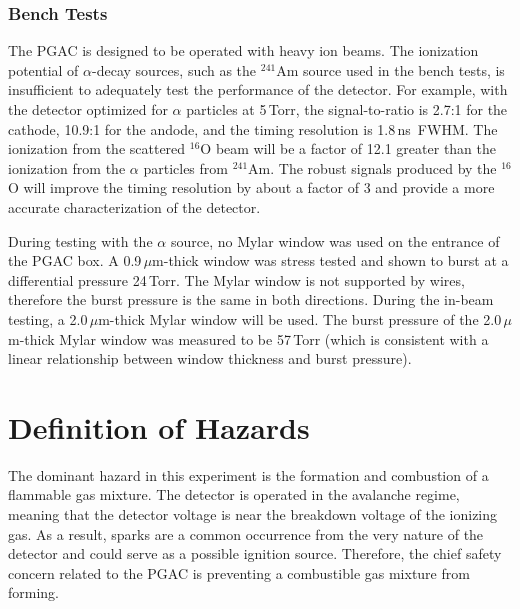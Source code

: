 \subsubsection{Bench Tests}
The PGAC is designed to be operated with heavy ion beams.  The ionization potential of $\alpha$-decay sources, such as the $^{241}$Am source used in the bench tests,  is insufficient to adequately test the performance of the detector.  For example, with the detector optimized for $\alpha$ particles at 5\,Torr, the signal-to-ratio is %
2.7:1  for the cathode, 10.9:1 for the andode,
 and the timing resolution is 1.8\,ns~FWHM.  %
The ionization from the scattered $^{16}$O beam will be a factor of 12.1 greater than the ionization from the $\alpha$ particles from $^{241}$Am. The robust signals produced by the $^{16}$O will improve the timing resolution by about a factor of 3 and provide a more accurate characterization of the detector.

During testing with the $\alpha$ source, no Mylar window was used on the entrance of the PGAC box.  A 0.9\,$\mu$m-thick window was stress tested and shown to burst at a differential pressure 24\,Torr.  The Mylar window is not supported by wires, therefore the burst pressure is the same in both directions.  During the in-beam testing, a  2.0\,$\mu$m-thick Mylar window will be used.  
The burst pressure of the 2.0\,$\mu$m-thick Mylar window was measured to be 57\,Torr (which is consistent with a linear relationship between window thickness and burst pressure).



\section{Definition of Hazards}
The dominant hazard in this experiment is the formation and combustion of a flammable gas
mixture.  The detector is operated in the avalanche regime, meaning that the detector voltage is near the breakdown voltage of the ionizing gas.  As a result, sparks are a common occurrence from the very nature of the detector and could serve as a possible ignition source.  Therefore, the chief safety concern related to the PGAC is preventing a combustible gas 
mixture from  forming.


